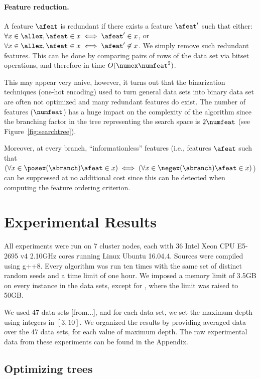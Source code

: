 \documentclass{llncs}
\begin{document}
\paragraph{Feature reduction.}

A feature $\afeat$ is redundant if there exists a feature $\afeat'$ such that either: $\forall x \in \allex, \afeat \in x \iff \afeat' \in x$, or $\forall x \in \allex, \afeat \in x \iff \afeat' \not\in x$. We simply remove such redundant features. This can be done by comparing pairs of rows of the data set via bitset operations, and therefore in time $O(\numex\numfeat^2)$.

This may appear very naive, however, it turns out that the binarization techniques (one-hot encoding) used to turn general data sets into binary data set are often not optimized and many redundant features do exist. The number of features ($\numfeat$) has a huge impact on the complexity of the algorithm since the branching factor in the tree representing the search space is $2\numfeat$ (see Figure~\ref{fig:searchtree}).

Moreover, at every branch, ``informationless'' features (i.e., features $\afeat$ such that $(\forall x \in \posex(\abranch) \afeat \in x) \iff (\forall x \in \negex(\abranch) \afeat \in x)$) can be suppressed at no additional cost since this can be detected when computing the feature ordering criterion.




\section{Experimental Results}

All experiments were run
on 7 cluster nodes, each with 36 Intel Xeon CPU E5-2695 v4 2.10GHz cores
running Linux Ubuntu 16.04.4. Sources were compiled using g++8. 
Every algorithm was run ten times with the same set of distinct random seeds and a time limit of one hour. We imposed a memory limit of 3.5GB on every instance in the data sets, except for \dleight, where the limit was raised to 50GB.

We used 47 data sets [from...], and for each data set, we set the maximum depth using integers in $[3,10]$. We organized the results by providing averaged data over the 47 data sets, for each value of maximum depth.
The raw experimental data from these experiments can be found in the Appendix.



\subsection{Optimizing trees}
\end{document}
